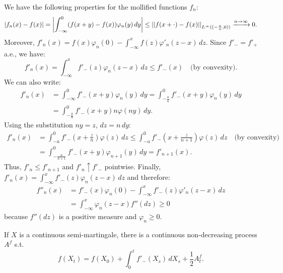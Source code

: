\begin{remark}
    We have the following properties for the mollified functions $f_n$:
    \begin{equation*}
        |f_n(x) - f(x)| = \left| \int_{-\infty}^0 (f(x+y) - f(x)) \varphi_n(y) \, dy \right| \leq \left|\left|f(x+\cdot) - f(x)\right|\right|_{L^\infty((-\frac{a}{n}, 0))} \xrightarrow{n \to \infty} 0.
    \end{equation*}
    Moreover, $f'_n(x) = f(x)\varphi_n(0) - \int_{-\infty}^x f(z) \varphi'_n(z-x) \, dz$.
    Since $f'_- = f'_+$ a.e., we have:
    \begin{equation*}
        f'_n(x) = \int_{-\infty}^x f'_-(z) \varphi_n(z-x) \, dz \leq f'_-(x) \quad \text{(by convexity)}.
    \end{equation*}
    We can also write:
    \begin{align*}
        f'_n(x) &= \int_{-\infty}^0 f'_-(x+y) \varphi_n(y) \, dy = \int_{-\frac{a}{n}}^0 f'_-(x+y) \varphi_n(y) \, dy \\
        &= \int_{-\frac{a}{n}}^0 f'_-(x+y) n \varphi(ny) \, dy.
    \end{align*}
    Using the substitution $ny = z$, $dz = n \, dy$:
    \begin{align*}
        f'_n(x) &= \int_{-a}^0 f'_-(x+\frac{z}{n}) \varphi(z) \, dz \leq \int_{-a}^0 f'_-(x+\frac{z}{n+1}) \varphi(z) \, dz \quad \text{(by convexity)} \\
        &= \int_{-\frac{a}{n+1}}^0 f'_-(x+y) \varphi_{n+1}(y) \, dy = f'_{n+1}(x).
    \end{align*}
    Thus, $f'_n \leq f'_{n+1}$ and $f'_n \uparrow f'_-$ pointwise.
    Finally, $f'_n(x) = \int_{-\infty}^x f'_-(z) \varphi_n(z-x) \, dz$ and therefore:
    \begin{align*}
        f''_n(x) &= f'_-(x)\varphi_n(0) - \int_{-\infty}^x f'_-(z) \varphi'_n(z-x) \, dz \\
        &= \int_{-\infty}^x \varphi_n(z-x) f''(dz) \geq 0
    \end{align*}
    because $f''(dz)$ is a positive measure and $\varphi_n \geq 0$.
\end{remark}

\begin{theorem}
    If $X$ is a continuous semi-martingale, there is a continuous non-decreasing process $A^f$ s.t.
    \begin{equation*}
        f(X_t) = f(X_0) + \int_0^t f'_-(X_s) \, dX_s + \frac{1}{2} A^f_t.
    \end{equation*}
\end{theorem}

